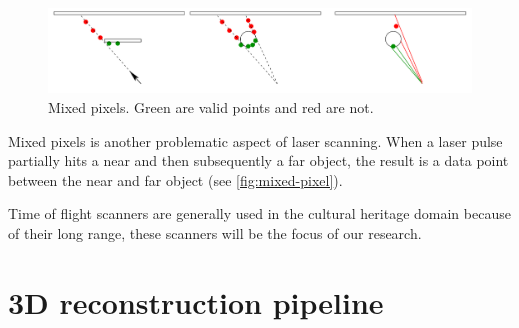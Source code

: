 
\begin{figure}[ht]
  \centering
  \includegraphics[width=1\linewidth]{images/mixed-pixel}
  \caption{Mixed pixels. Green are valid points and red are not. \cite{Tuley2005}}
  \label{fig:mixed-pixel}
\end{figure}

Mixed pixels is another problematic aspect of laser scanning. When a laser pulse partially hits a near and then subsequently a far object, the result is a data point between the near and far object \cite{Tuley2005} (see \autoref{fig:mixed-pixel}).


Time of flight scanners are generally used in the cultural heritage domain because of their long range, these scanners will be the focus of our research.


\section{3D reconstruction pipeline} \label{sec:pipeline}


